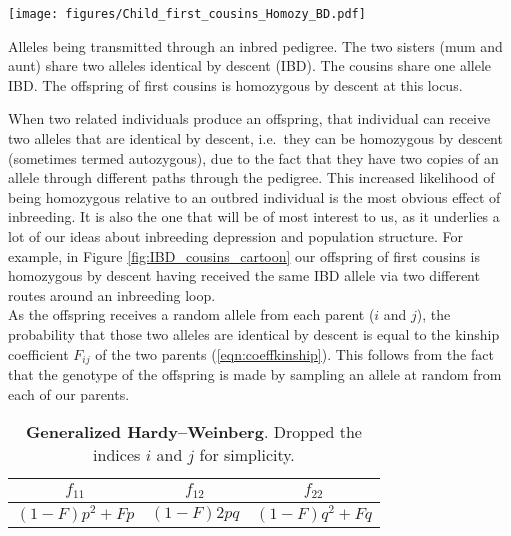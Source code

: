{{\begin{marginfigure}
\begin{center}
\texttt{[image: figures/Child\_first\_cousins\_Homozy\_BD.pdf]}
\end{center}
\caption{Alleles being transmitted through an inbred pedigree. The two sisters (mum and aunt) share two alleles identical by descent (IBD). The cousins share one
  allele IBD. The offspring of first cousins is homozygous by
  descent at this locus.} \label{fig:IBD_cousins_cartoon}
\end{marginfigure}
When two related individuals produce an offspring, that individual can
receive two alleles that are identical by descent, i.e.\ they
can be homozygous by descent (sometimes termed autozygous), due to the
fact that they have two copies of an allele through different paths
through the pedigree.  This increased likelihood of being homozygous
relative to an outbred individual is the most obvious effect of
inbreeding. It is also the one that will be of most interest to us, as it
underlies a lot of our ideas about inbreeding depression and
population structure. For example, in Figure \ref{fig:IBD_cousins_cartoon} our
offspring of first cousins is homozygous by descent having received
the same IBD allele via two different routes around an inbreeding loop.\\

As the offspring receives a random allele from each parent ($i$ and $j$), the
probability that those two alleles are identical by descent is equal to the
kinship coefficient $F_{ij}$ of the two parents (\eqn \ref{eqn:coeffkinship}). This follows from the fact that
the genotype of the offspring is made by sampling an allele at random from each
of our parents. %

\begin{table}
\begin{center}
\begin{tabular}{ccc}
\hline
$f_{11}$ & $f_{12}$ & $f_{22}$ \\
\hline
$(1-F) p^2 + F p$ & $(1-F) 2pq$ & $(1-F) q^2 + F q$ \\
\hline
\end{tabular}
\end{center}
\caption{\textbf{Generalized Hardy--Weinberg}.  Dropped the indices $i$ and $j$ for simplicity. } \label{table:GeneralizedHWE}
\end{table}

}}
